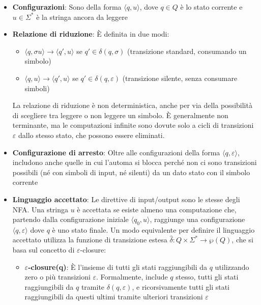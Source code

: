 \documentclass[12pt, a4paper]{report}
\begin{document}
                \begin{itemize}
                    \item \textbf{Configurazioni}: Sono della forma $\langle q, u \rangle$, dove $q \in Q$ è lo stato corrente e $u \in \Sigma^*$ è la stringa ancora da leggere
                    \item \textbf{Relazione di riduzione}: È definita in due modi: \begin{itemize}
                        \item $\langle q, \sigma u \rangle \to \langle q', u \rangle$ se $q' \in \delta(q, \sigma)$ (transizione standard, consumando un simbolo)
                        \item $\langle q, u \rangle \to \langle q', u \rangle$ se $q' \in \delta(q, \varepsilon)$ (transizione silente, senza consumare simboli)
                    \end{itemize}
                    La relazione di riduzione è non deterministica, anche per via della possibilità di scegliere tra leggere o non leggere un simbolo. È generalmente non terminante, ma le computazioni infinite sono dovute solo a cicli di transizioni $\varepsilon$ dallo stesso stato, che possono essere eliminati.
                    \item \textbf{Configurazione di arresto}: Oltre alle configurazioni della forma $\langle q, \varepsilon \rangle$, includono anche quelle in cui l'automa si blocca perché non ci sono transizioni possibili (né con simboli di input, né silenti) da un dato stato con il simbolo corrente
                    \item \textbf{Linguaggio accettato}: Le direttive di input/output sono le stesse degli NFA. Una stringa $u$ è accettata se esiste almeno una computazione che, partendo dalla configurazione iniziale $\langle q_0, u \rangle$, raggiunge una configurazione $\langle q, \varepsilon \rangle$ dove $q$ è uno stato finale. Un modo equivalente per definire il linguaggio accettato utilizza la funzione di transizione estesa $\hat{\delta} : Q \times \Sigma^* \to \wp(Q)$, che si basa sul concetto di $\varepsilon$-closure: \begin{itemize}
                        \item \textbf{$\varepsilon$-closure(q)}: È l'insieme di tutti gli stati raggiungibili da $q$ utilizzando zero o più transizioni $\varepsilon$. Formalmente, include $q$ stesso, tutti gli stati raggiungibili da $q$ tramite $\delta(q, \varepsilon)$, e ricorsivamente tutti gli stati raggiungibili da questi ultimi tramite ulteriori transizioni $\varepsilon$

\end{itemize}
\end{itemize}
\end{document}
